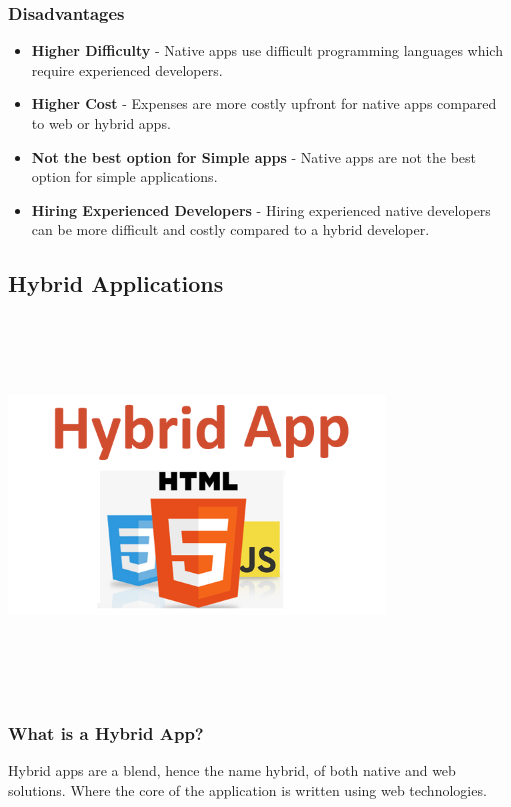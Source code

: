 \subsubsection{Disadvantages}
\begin{itemize}
    \item \textbf{Higher Difficulty} - Native apps use difficult programming languages which require experienced developers.
    \item \textbf{Higher Cost} - Expenses are more costly upfront for native apps compared to web or hybrid apps.
    \item \textbf{Not the best option for Simple apps} - Native apps are not the best option for simple applications.
    \item \textbf{Hiring Experienced Developers} - Hiring experienced native developers can be more difficult and costly compared to a hybrid developer.
\end{itemize}
\newpage
\subsection{Hybrid Applications}
\par
\medskip
\begin{center}
    \includegraphics[width=10cm,height=10cm,keepaspectratio]{Images/hybridapp.png}
\end{center}

\subsubsection{What is a Hybrid App?}
Hybrid apps are a blend, hence the name hybrid, of both native and web solutions. Where the core of the application is written using web technologies.\newline

